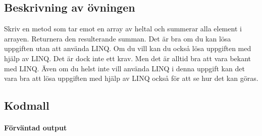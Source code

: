 \hypertarget{beskrivning-av-uxf6vningen}{%
\subsection{Beskrivning av övningen}\label{beskrivning-av-uxf6vningen}}

Skriv en metod som tar emot en array av heltal och summerar alla element
i arrayen. Returnera den resulterande summan. Det är bra om du kan lösa
uppgiften utan att använda LINQ. Om du vill kan du också lösa uppgiften
med hjälp av LINQ. Det är dock inte ett krav. Men det är alltid bra att
vara bekant med LINQ. Även om du helst inte vill använda LINQ i denna
uppgift kan det vara bra att lösa uppgiften med hjälp av LINQ också för
att se hur det kan göras.

\hypertarget{kodmall}{%
\subsection{Kodmall}\label{kodmall}}

\hypertarget{cb1}{}
\begin{Shaded}
\begin{Highlighting}[]
 \OperatorTok{\{}
       \OperatorTok{(}\OperatorTok{[]}\OperatorTok{)} \OperatorTok{\{}
    \OperatorTok{\}}
       \OperatorTok{(}\OperatorTok{[]}\OperatorTok{)} \OperatorTok{\{}
        \OperatorTok{[]}\OperatorTok{=} \OperatorTok{\{} \OperatorTok{,} \OperatorTok{,} \OperatorTok{,} \OperatorTok{,}  \OperatorTok{\};}
        \OperatorTok{=} \OperatorTok{(}\OperatorTok{);}
        \OperatorTok{(}\OperatorTok{);}
    \OperatorTok{\}}
\OperatorTok{\}}
\end{Highlighting}
\end{Shaded}

\hypertarget{fuxf6rvuxe4ntad-output}{%
\paragraph{Förväntad output}\label{fuxf6rvuxe4ntad-output}}

